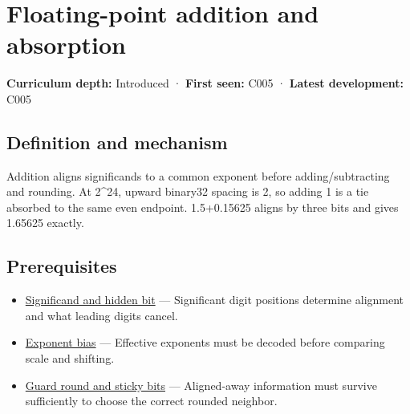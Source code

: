 \hypertarget{appendix-a1b1b4580dfd}{}\label{referencestart:appendix-a1b1b4580dfd}
\section{Floating-point addition and absorption}\label{appendix-a1b1b4580dfd-floating-point-addition-and-absorption}

\hypertarget{appendix-a1b1b4580dfd-floating-point-addition-and-absorption}{}

\textbf{Curriculum depth:} Introduced · \textbf{First seen:} C005 · \textbf{Latest development:} C005

\begin{allmightroledefinition}

\subsection{Definition and mechanism}\label{appendix-a1b1b4580dfd-definition-and-mechanism}

\hypertarget{appendix-a1b1b4580dfd-definition-and-mechanism}{}

Addition aligns significands to a common exponent before adding/subtracting and rounding. At 2\^{}24, upward binary32 spacing is 2, so adding 1 is a tie absorbed to the same even endpoint. 1.5+0.15625 aligns by three bits and gives 1.65625 exactly.

\end{allmightroledefinition}

\subsection{Prerequisites}\label{appendix-a1b1b4580dfd-prerequisites}

\hypertarget{appendix-a1b1b4580dfd-prerequisites}{}

\begin{itemize}
\tightlist
\item
  \hyperref[appendix-a24fd710cf67]{Significand and hidden bit} --- Significant digit positions determine alignment and what leading digits cancel.
\item
  \hyperref[appendix-2fae058c82e1]{Exponent bias} --- Effective exponents must be decoded before comparing scale and shifting.
\item
  \hyperref[appendix-b572b631069b]{Guard round and sticky bits} --- Aligned-away information must survive sufficiently to choose the correct rounded neighbor.
\end{itemize}

